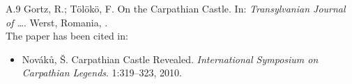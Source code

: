 \documentclass[12pt,twoside,a4paper,final]{memoir}%
\begin{document}






%


\renewcommand\bibname{Reviewed Publications of the Author Relevant to the Thesis}
\begin{thebibliography}{A.9}%
\itemsep=0pt
%
Gortz, R.; T\"ol\"ok\"o, F.
\newblock On the Carpathian Castle.
\newblock In: \textit{Transylvanian Journal of \dots}.
\newblock Werst, Romania,
.
\bigskip \\ \smallskip The paper has been cited in:
\begin{itemize}
\item Nov\'ak\r{u}, \v{S}. Carpathian Castle Revealed. \textit{International Symposium on Carpathian Legends}. 1:319--323, 2010.
\end{itemize}
\end{thebibliography}
\end{document}
